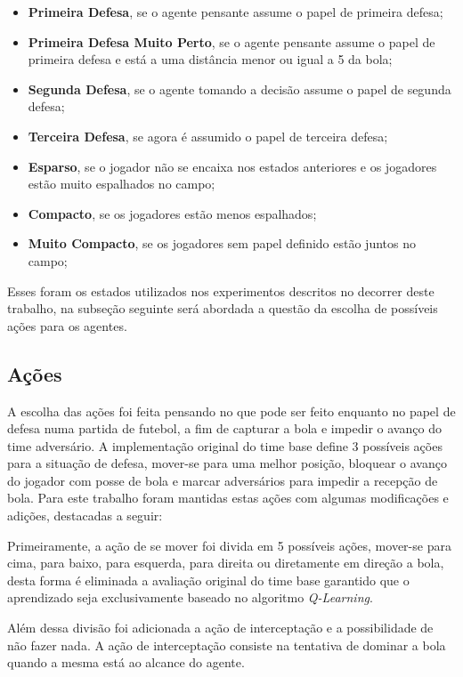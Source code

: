 \begin{itemize}
    \item \textbf{Primeira Defesa}, se o agente pensante assume o papel de
    primeira defesa;
    \item \textbf{Primeira Defesa Muito Perto}, se o agente pensante assume o papel de
    primeira defesa e está a uma distância menor ou igual a 5 da bola;
    \item  \textbf{Segunda Defesa}, se o agente tomando a decisão assume o papel
    de segunda defesa;
    \item \textbf{Terceira Defesa}, se agora é assumido o papel de terceira
    defesa;
    \item \textbf{Esparso}, se o jogador não se encaixa nos estados anteriores e
    os jogadores estão muito espalhados no campo;
    \item \textbf{Compacto}, se os jogadores estão menos espalhados;
    \item \textbf{Muito Compacto}, se os jogadores sem papel definido estão
    juntos no campo;
\end{itemize}

Esses foram os estados utilizados nos experimentos descritos no decorrer deste
trabalho, na subseção seguinte será abordada a questão da escolha de possíveis
ações para os agentes.

\subsection{Ações}\label{actions}

A escolha das ações foi feita pensando no que pode ser feito enquanto no papel de
defesa numa partida de futebol, a fim de capturar a bola e impedir o avanço do
time adversário. A implementação original do time base define 3 possíveis ações
para a situação de defesa, mover-se para uma melhor posição, bloquear o avanço
do jogador com posse de bola e marcar adversários para impedir a recepção de
bola. Para este trabalho foram mantidas estas ações com algumas modificações e
adições, destacadas a seguir:

Primeiramente, a ação de se mover foi divida em 5 possíveis ações, mover-se para
cima, para baixo, para esquerda, para direita ou diretamente em direção a bola, desta forma é eliminada a
avaliação original do time base garantido que o aprendizado seja exclusivamente
baseado no algoritmo \textit{Q-Learning}.

Além dessa divisão foi adicionada a ação de interceptação e a possibilidade de
não fazer nada. A ação de interceptação consiste na tentativa de dominar a bola
quando a mesma está ao alcance do agente.


